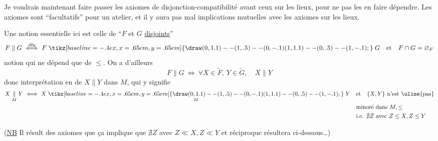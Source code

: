 Je voudrais maintenant faire passer les axiomes de disjonction-compatibilité avant ceux sur les lieux, pour ne pas  les en faire dépendre. Les axiomes sont ``facultatifs'' pour un atelier, et il y aura pas mal  implications mutuelles avec les axiomes sur les lieux.

Une notion essentielle ici est celle de ``$F$ et $G$ \uline{disjoints}''
\[
 F\parallel G\ \overset{\mathrm{dfn}}{\Longleftrightarrow}\ F\mathrel{\tikz[baseline=-.4ex,x=.65em,y=.65em]{\draw (0,1.1)--(1,.5)--(0,-.1) (1,1.1)--(0,.5)--(1,-.1);}}G\quad\text{et}\quad F\cap G=\varnothing_F
\]
notion qui ne dépend que de $\leq$. On a d'ailleurs
\[
 F\parallel G\ \Longleftrightarrow\ \forall X\in\widetilde F,\ Y\in\widetilde G,\quad X\parallel Y
\]
donc interprétation en  de $X\parallel Y$ dans $M$, qui y signifie
\[
\begin{aligned}
X\mathrel{\underset{M}{\parallel}}Y\ \Longleftrightarrow\
 X\mathrel{\underset{M}{\mathrel{\tikz[baseline=-.4ex,x=.65em,y=.65em]{\draw (0,1.1)--(1,.5)--(0,-.1) (1,1.1)--(0,.5)--(1,-.1);}}}}Y\quad &\text{et}\quad\{X,Y\}\ \text{n'est \uline{pas}}\\
&\text{minoré dans } M,\leq\\
&\text{i.e. }\nexists Z\ \text{avec }Z\leq X,Z\leq Y
\end{aligned}
\]

(\uline{NB} Il résult\deleted{\unsure{era}}\inserted{\unsure{e|era}} des axiomes  que ça implique que $\nexists Z$ avec $Z\ll X,Z\ll Y$\unsure{)|,}  et  réciproque résultera  ci-dessous\ldots)

